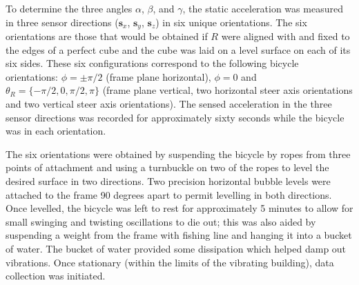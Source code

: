 To determine the three angles $\alpha$, $\beta$, and $\gamma$, the static
acceleration was measured in three sensor directions ($\bm{s}_x$, $\bm{s}_y$,
$\bm{s}_z$) in six unique orientations. The six orientations are those that
would be obtained if $R$ were aligned with and fixed to the edges of a perfect
cube and the cube was laid on a level surface on each of its six sides.  These
six configurations correspond to the following bicycle orientations:
$\phi=\pm\pi/2$ (frame plane horizontal), $\phi=0$ and $\theta_R = \{-\pi/2, 0,
\pi/2, \pi\}$ (frame plane vertical, two horizontal steer axis orientations and
two vertical steer axis orientations). The sensed acceleration in the three sensor
directions was recorded for approximately sixty seconds while the bicycle was
in each orientation.

The six orientations were obtained by suspending the bicycle by ropes from
three points of attachment and using a turnbuckle on two of the ropes to level
the desired surface in two directions. Two precision horizontal bubble levels
were attached to the frame 90 degrees apart to permit levelling in both
directions.  Once levelled, the bicycle was left to rest for approximately 5
minutes to allow for small swinging and twisting oscillations to die out; this
was also aided by suspending a weight from the frame with fishing line and
hanging it into a bucket of water. The bucket of water provided some
dissipation which helped damp out vibrations. Once stationary (within the
limits of the vibrating building), data collection was initiated.


